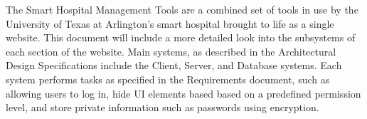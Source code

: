 The Smart Hospital Management Tools are a combined set of tools in use by the University of Texas at Arlington's smart hospital brought to life as a single website. This document will include a more detailed look into the subsystems of each section of the website. Main systems, as described in the Architectural Design Specifications include the Client, Server, and Database systems. Each system performs tasks as specified in the Requirements document, such as allowing users to log in, hide UI elements based based on a predefined permission level, and store private information such as passwords using encryption.